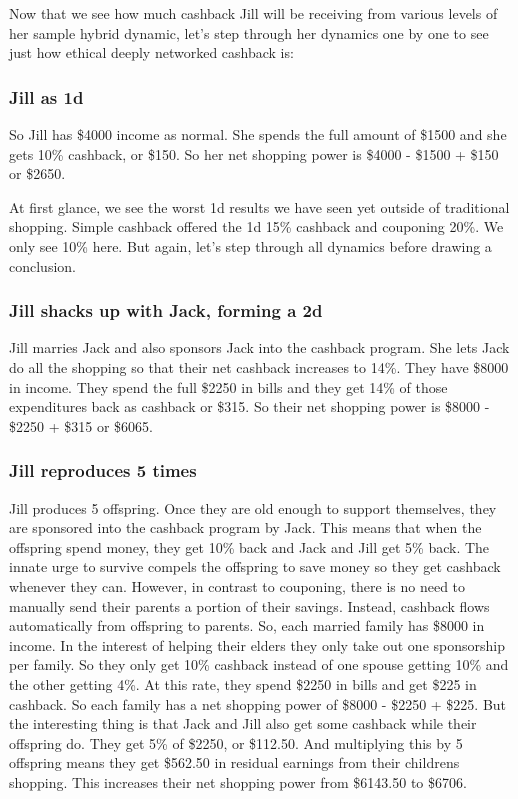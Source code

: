 \documentclass{article}%
\begin{document}
Now that we see how much cashback Jill will be receiving from various levels of her sample hybrid dynamic, let's step through her dynamics one by one to see just how ethical deeply networked cashback is:

\subsubsection{Jill as 1d}

    So Jill has \$4000 income as normal. She spends the full amount of \$1500 and she gets 10\% cashback, or \$150. So her net shopping power is \$4000 - \$1500 + \$150 or \$2650. 
    
At first glance, we see the worst 1d results we have seen yet outside of traditional shopping. Simple cashback offered the 1d 15\% cashback and couponing 20\%. We only see 10\% here. But again, let's step through all dynamics before drawing a conclusion.
    
\subsubsection{Jill shacks up with Jack, forming a 2d}  

    Jill marries Jack and also sponsors Jack into the cashback program. She lets Jack do all the shopping so that their net cashback increases to 14\%. They have \$8000 in income. They spend the full \$2250 in bills and they get 14\% of those expenditures back as cashback or \$315. So their net shopping power is \$8000 - \$2250 + \$315 or \$6065.

\subsubsection{Jill reproduces 5 times}
  
Jill produces 5 offspring. Once they are old enough to support themselves, they are sponsored into the cashback program by Jack. This means that when the offspring spend money, they get 10\% back and Jack and Jill get 5\% back. The innate urge to survive compels the offspring to save money so they get cashback whenever they can. However, in contrast to couponing, there is no need to manually send their parents a portion of their savings. Instead, cashback flows automatically from offspring to parents. So, each married family has \$8000 in income. In the interest of helping their elders they only take out one sponsorship per family. So they only get 10\% cashback instead of one spouse getting 10\% and the other getting 4\%. At this rate, they spend \$2250 in bills and get \$225 in cashback. So each family has a net shopping power of \$8000 - \$2250 + \$225. But the interesting thing is that Jack and Jill also get some cashback while their offspring do. They get 5\% of \$2250, or \$112.50. And multiplying this by 5 offspring means they get \$562.50 in residual earnings from their childrens shopping. This increases their net shopping power from \$6143.50 to \$6706. 
\end{document}
